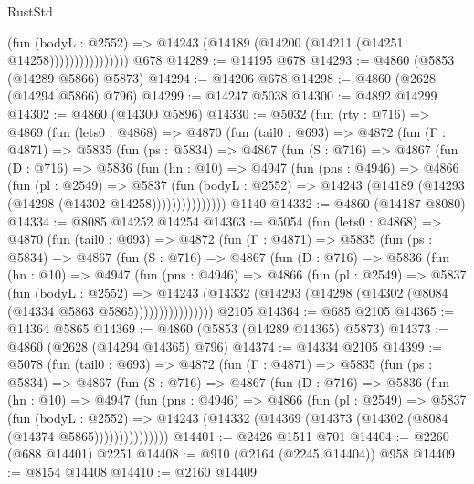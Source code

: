 \begin{lexlean}{RustStd}
\begin{coremodule}
                          (fun (bodyL : @2552) =>
                          @14243 (@14189 (@14200 (@14211 (@14251 @14258))))))))))))))))
    @678
@14289 := @14195 @678
@14293 := @4860 (@5853 (@14289 @5866) @5873)
@14294 := @14206 @678
@14298 := @4860 (@2628 (@14294 @5866) @796)
@14299 := @14247 @5038
@14300 := @4892 @14299
@14302 := @4860 (@14300 @5896)
@14330 := @5032
    (fun (rty : @716) =>
    @4869
      (fun (lets0 : @4868) =>
      @4870
        (fun (tail0 : @693) =>
        @4872
          (fun (Γ : @4871) =>
          @5835
            (fun (ps : @5834) =>
            @4867
              (fun (S : @716) =>
              @4867
                (fun (D : @716) =>
                @5836
                  (fun (hn : @10) =>
                  @4947
                    (fun (pns : @4946) =>
                    @4866
                      (fun (pl : @2549) =>
                      @5837
                        (fun (bodyL : @2552) =>
                        @14243 (@14189 (@14293 (@14298 (@14302 @14258)))))))))))))))
    @1140
@14332 := @4860 (@14187 @8080)
@14334 := @8085 @14252 @14254
@14363 := @5054
    (fun (lets0 : @4868) =>
    @4870
      (fun (tail0 : @693) =>
      @4872
        (fun (Γ : @4871) =>
        @5835
          (fun (ps : @5834) =>
          @4867
            (fun (S : @716) =>
            @4867
              (fun (D : @716) =>
              @5836
                (fun (hn : @10) =>
                @4947
                  (fun (pns : @4946) =>
                  @4866
                    (fun (pl : @2549) =>
                    @5837
                      (fun (bodyL : @2552) =>
                      @14243
                        (@14332 (@14293 (@14298 (@14302 (@8084 (@14334 @5863 @5865))))))))))))))))
    @2105
@14364 := @685 @2105
@14365 := @14364 @5865
@14369 := @4860 (@5853 (@14289 @14365) @5873)
@14373 := @4860 (@2628 (@14294 @14365) @796)
@14374 := @14334 @2105
@14399 := @5078
    (fun (tail0 : @693) =>
    @4872
      (fun (Γ : @4871) =>
      @5835
        (fun (ps : @5834) =>
        @4867
          (fun (S : @716) =>
          @4867
            (fun (D : @716) =>
            @5836
              (fun (hn : @10) =>
              @4947
                (fun (pns : @4946) =>
                @4866
                  (fun (pl : @2549) =>
                  @5837
                    (fun (bodyL : @2552) =>
                    @14243 (@14332 (@14369 (@14373 (@14302 (@8084 (@14374 @5865)))))))))))))))
@14401 := @2426 @1511 @701
@14404 := @2260 (@688 @14401) @2251
@14408 := @910 (@2164 (@2245 @14404)) @958
@14409 := @8154 @14408
@14410 := @2160 @14409

\end{coremodule}
\end{lexlean}
